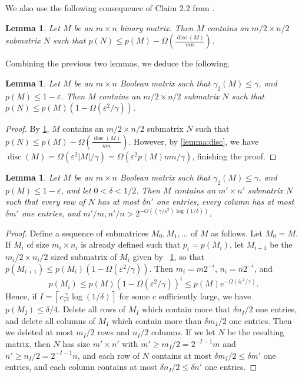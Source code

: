 \documentclass[11pt]{amsart}
\theoremstyle{plain}
\newtheorem{lemma}[theorem]{Lemma}
\theoremstyle{definition}
\DeclareMathOperator{\disc}{disc}
\begin{document}
We also use the following consequence of Claim 2.2 from \cite{ST24}.

\begin{lemma}\label{lemma:half_sized}
Let $M$ be an $m\times n$ binary matrix. Then $M$ contains an $m/2\times n/2$ submatrix $N$ such that $p(N)\leq p(M)-\Omega(\frac{\disc(M)}{mn})$.
\end{lemma}

Combining the previous two lemmas, we deduce the following.
\begin{lemma} \label{lemma:disc_decrement}
Let $M$ be an $m\times n$ Boolean matrix such that $\gamma_2(M)\leq \gamma$, and $p(M)\leq 1-\varepsilon$. Then $M$ contains an $m/2\times n/2$ submatrix $N$ such that $p(N)\leq p(M)(1-\Omega(\varepsilon^2/\gamma))$.
\end{lemma}

\begin{proof}
By \cref{lemma:half_sized},  $M$ contains an $m/2\times n/2$ submatrix $N$ such that $p(N)\leq p(M)-\Omega(\frac{\disc(M)}{mn})$. However, by \cref{lemma:disc}, we have $\disc(M)=\Omega(\varepsilon^2|M|/\gamma)=\Omega(\varepsilon^2 p(M)mn/\gamma)$, finishing the proof.
\end{proof}

\begin{lemma}\label{lemma:sparsifying}
Let $M$ be an $m\times n$ Boolean matrix such that $\gamma_2(M)\leq \gamma$, and $p(M)\leq 1-\varepsilon$, and let $0<\delta<1/2$. Then $M$ contains an $m'\times n'$ submatrix $N$ such that every row of $N$ has at most $\delta n'$ one entries, every column has at most $\delta m'$ one entries, and $m'/m, n'/n > 2^{-O((\gamma/\varepsilon^2)\log(1/\delta))}$.
\end{lemma}

\begin{proof}
Define a sequence of submatrices $M_0,M_1,\dots$ of $M$ as follows. Let $M_0=M$. If $M_i$ of size $m_i\times n_i$ is already defined such that $p_i=p(M_i)$, let $M_{i+1}$ be the $m_{i}/2\times n_{i}/2$ sized submatrix of $M_i$ given by ~\cref{lemma:disc_decrement}, so that $p(M_{i+1})\leq p(M_i)(1-\Omega(\varepsilon^2/\gamma))$. Then $m_i=m2^{-i}$, $n_i=n2^{-i}$, and 
$$p(M_i)\leq p(M)(1-\Omega(\varepsilon^2/\gamma))^i\leq p(M)e^{-\Omega(i\varepsilon^2/\gamma)}.$$ Hence, if $I = \left\lceil c\frac{\gamma}{\varepsilon^2} \log (1/\delta) \right\rceil$ for some $c$ sufficiently large, we have $p(M_I)\leq \delta/4$. Delete all rows of $M_I$ which contain more that $\delta n_I/2$ one entries, and delete all columns of $M_I$ which contain more than $\delta m_I/2$ one entries. Then we deleted at most $m_I/2$ rows and $n_I/2$ columns. If we let $N$ be the resulting matrix, then $N$ has size $m'\times n'$ with $m'\geq m_I/2= 2^{-I-1}m$ and $n'\geq n_I/2=2^{-I-1}n$, and each row of $N$ contains at most $\delta m_I/2 \leq \delta m'$ one entries, and each column contains at most $\delta n_I/2 \leq \delta n'$ one entries. 
\end{proof}
\end{document}
